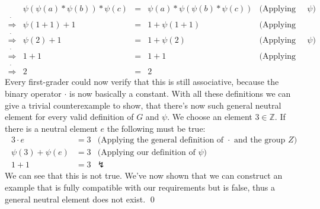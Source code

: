 \documentclass{article}
\begin{document}
\[
\begin{array}{lrclr}
    &\psi(\psi(a) * \psi(b)) * \psi(c) &=& \psi(a) * \psi(\psi(b) * \psi(c)) &\text{(Applying our definition of } \psi \text{)}\\
    \dot\Rightarrow& \psi(1 + 1) + 1 &=& 1 + \psi(1 + 1) &\text{(Applying elementary school math)}\\
    \dot\Rightarrow& \psi(2) + 1 &=& 1 + \psi(2) &\text{(Applying our definition of } \psi \text{)}\\
    \dot\Rightarrow& 1 + 1 &=& 1 + 1 &\text{(Applying elementary school math)} \\
    \dot\Rightarrow&2 &=& 2 &
\end{array}
\]
Every first-grader could now verify that this is still associative, because the binary operator $\cdot$ is now basically a constant.
With all these definitions we can give a trivial counterexample to show, that there's now such general neutral element for every valid definition of $G$ and $\psi$. We choose an element $3 \in \mathbb{Z}$. If there is a neutral element $e$ the following must be true:
\begin{align*}
    3 \cdot e &= 3 &\text{(Applying the general definition of }\cdot\text{ and the group } Z \text{)}\\
    \psi(3) + \psi(e) &= 3 &\text{(Applying our definition of } \psi \text{)} \\
    1 + 1 &= 3 &\lightning
\end{align*}
We can see that this is not true. We've now shown that we can construct an example that is fully compatible with our requirements but is false, thus a general neutral element does not exist. \qed
\end{document}
